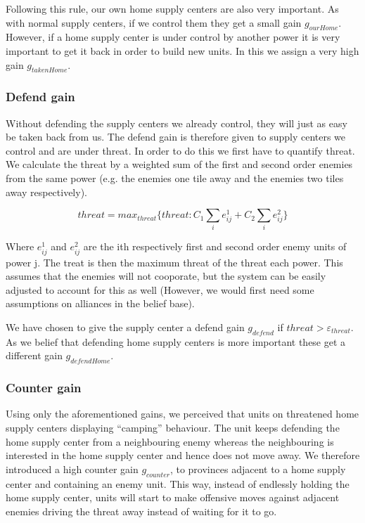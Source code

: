 \documentclass[a4paper]{article} %
\begin{document}
Following this rule, our own home supply centers are also very important. As with normal supply centers, if we control them they get a small gain $g_{ourHome}$. However, if a home supply center is under control by another power it is very important to get it back in order to build new units. In this we assign a very high gain $g_{takenHome}$. 

\subsubsection{Defend gain}
\label{sec:defendgain}
Without defending the supply centers we already control, they will just as easy be taken back from us. The defend gain is therefore given to supply centers we control and are under threat. In order to do this we first have to quantify threat. We calculate the threat by a weighted sum of the first and second order enemies from the same power (e.g. the enemies one tile away and the enemies two tiles away respectively). 

$$threat = max_{threat}\{ threat : C_1 \sum_{i} e^{1}_{ij} + C_2 \sum_{i} e^{2}_{ij}\}$$

Where $e^1_{ij}$ and $e^2_{ij}$ are the ith respectively first and second order enemy units of power j. The treat is then the maximum threat of the threat each power. This assumes that the enemies will not cooporate, but the system can be easily adjusted to account for this as well (However, we would first need some assumptions on  alliances in the belief base). 

We have chosen to give the supply center a defend gain $g_{defend}$ if $threat > \varepsilon_{threat}$. As we belief that defending home supply centers is more important these get a different gain $g_{defendHome}$. 

\subsubsection{Counter gain}
\label{sec:countergain}
Using only the aforementioned gains, we perceived that units on threatened home supply centers displaying  ``camping'' behaviour. The unit keeps defending the home supply center from a neighbouring enemy whereas the neighbouring is interested in the home supply center and hence does not move away. We therefore introduced a high counter gain $g_{counter}$, to provinces adjacent to a home supply center and containing an enemy unit. This way, instead of endlessly holding the home supply center, units will start to make offensive moves against adjacent enemies driving the threat away instead of waiting for it to go.        
\end{document}
